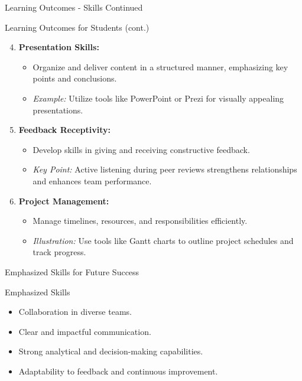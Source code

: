 \documentclass[aspectratio=169]{beamer}
\begin{document}
\begin{frame}[fragile]{Learning Outcomes - Skills Continued}
    \begin{block}{Learning Outcomes for Students (cont.)}
        \begin{enumerate}
            \setcounter{enumi}{3} %
            \item \textbf{Presentation Skills:}
            \begin{itemize}
                \item Organize and deliver content in a structured manner, emphasizing key points and conclusions.
                \item \textit{Example:} Utilize tools like PowerPoint or Prezi for visually appealing presentations.
            \end{itemize}

            \item \textbf{Feedback Receptivity:}
            \begin{itemize}
                \item Develop skills in giving and receiving constructive feedback.
                \item \textit{Key Point:} Active listening during peer reviews strengthens relationships and enhances team performance.
            \end{itemize}

            \item \textbf{Project Management:}
            \begin{itemize}
                \item Manage timelines, resources, and responsibilities efficiently.
                \item \textit{Illustration:} Use tools like Gantt charts to outline project schedules and track progress.
            \end{itemize}
        \end{enumerate}
    \end{block}
\end{frame}

\begin{frame}[fragile]{Emphasized Skills for Future Success}
    \begin{block}{Emphasized Skills}
        \begin{itemize}
            \item Collaboration in diverse teams.
            \item Clear and impactful communication.
            \item Strong analytical and decision-making capabilities.
            \item Adaptability to feedback and continuous improvement.
        \end{itemize}
    \end{block}
\end{frame}
\end{document}
